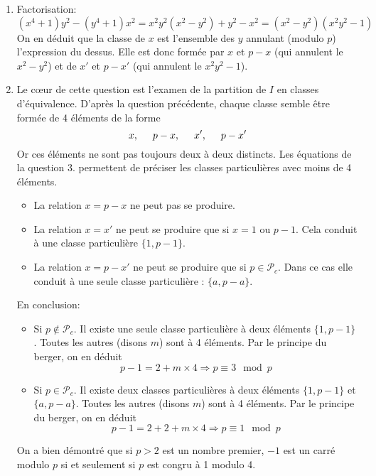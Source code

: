 \begin{enumerate}
\item Factorisation:
\begin{displaymath}
  (x^4+1)y^2 - (y^4+1)x^2 = x^2y^2(x^2-y^2) + y^2 - x^2 = (x^2-y^2)(x^2y^2 - 1)
\end{displaymath}
On en déduit que la classe de $x$ est l'ensemble des $y$ annulant (modulo $p$) l'expression du dessus. Elle est donc formée par $x$ et $p-x$ (qui annulent le $x^2 -y^2$) et de $x'$ et $p-x'$ (qui annulent le $x^2y^2-1$).

\item Le c\oe{}ur de cette question est l'examen de la partition de $I$ en classes d'équivalence. D'après la question précédente, chaque classe semble être formée de 4 éléments de la forme 
\begin{displaymath}
  x,\hspace{0.5cm} p-x,\hspace{0.5cm} x',\hspace{0.5cm} p-x'
\end{displaymath}
Or ces éléments ne sont pas toujours deux à deux distincts. Les équations de la question 3. permettent de préciser les classes particulières avec moins de 4 éléments.
\begin{itemize}
  \item La relation $x=p-x$ ne peut pas se produire.
  \item La relation $x=x'$ ne peut se produire que si $x=1$ ou $p-1$. Cela conduit à une classe particulière $\{1,p-1\}$.
  \item La relation $x = p-x'$ ne peut se produire que si $p\in \mathcal{P}_c$. Dans ce cas elle conduit à une seule classe particulière : $\{a,p-a\}$.
\end{itemize}
En conclusion:
\begin{itemize}
  \item Si $p\notin \mathcal{P}_c$. Il existe une seule classe particulière à deux éléments $\{1,p-1\}$. Toutes les autres (disons $m$) sont à 4 éléments. Par le principe du berger, on en déduit
\begin{displaymath}
  p-1 = 2 + m\times 4 \Rightarrow p \equiv 3 \mod p
\end{displaymath}
  \item Si $p\in \mathcal{P}_c$. Il existe deux classes particulières à deux éléments $\{1,p-1\}$ et $\{a,p-a\}$. Toutes les autres (disons $m$) sont à 4 éléments. Par le principe du berger, on en déduit
\begin{displaymath}
  p-1 = 2 + 2 + m\times 4 \Rightarrow p \equiv 1 \mod p
\end{displaymath}
\end{itemize}
On a bien démontré que si $p>2$ est un nombre premier, $-1$ est un carré modulo $p$ si et seulement si $p$ est congru à 1 modulo 4.
 
\end{enumerate}

